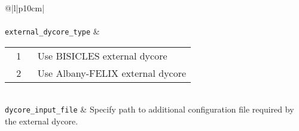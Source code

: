 \begin{center}
\begin{supertabular*}{\textwidth}{@{\extracolsep{\fill}}|l|p{10cm}|}
    \hline
    \hline
    \hline
    \\
    \hline
    \\
    \hline
    \texttt{external\_dycore\_type} & 
    \begin{tabular}[t]{cp{0.85\linewidth}}
      1 & Use BISICLES external dycore \\
      2 & Use Albany-FELIX external dycore \\
    \end{tabular}\\     
    \texttt{dycore\_input\_file} &
    Specify path to additional configuration file required by the external dycore. \\




\end{supertabular*}
\end{center}
